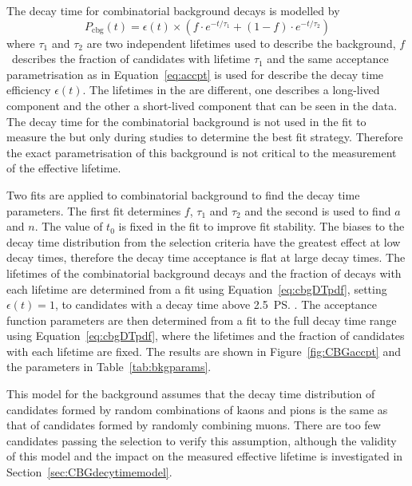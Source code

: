 The decay time \pdf for combinatorial background decays is modelled by
\begin{equation}
P_{\mathrm{cbg}}(t) = \epsilon(t)\times \left( f \cdot e^{-t/\tau_{1}} + (1-f)\cdot e^{-t/\tau_{2}} \right)
\label{eq:cbgDTpdf}
\end{equation}
where $\tau_{1}$ and $\tau_{2}$ are two independent lifetimes used to describe the background, $f$~describes the fraction of candidates with lifetime $\tau_{1}$ and the same acceptance parametrisation as in Equation~\ref{eq:accpt} is used for describe the decay time efficiency $\epsilon(t)$. The lifetimes in the \pdf are different, one describes a long-lived component and the other a short-lived component that can be seen in the data. The decay time \pdf for the combinatorial background is not used in the fit to measure the \el but only during studies to determine the best fit strategy. Therefore the exact parametrisation of this background is not critical to the measurement of the \bsmumu effective lifetime.  

Two fits are applied to \bhh combinatorial background to find the decay time \pdf parameters. The first fit determines $f$, $\tau_1$ and $\tau_2$ and the second is used to find $a$ and $n$. The value of $t_0$ is fixed in the fit to improve fit stability.
The biases to the decay time distribution from the selection criteria have the greatest effect at low decay times, therefore the decay time acceptance is flat at large decay times. The lifetimes of the combinatorial background decays and the fraction of decays with each lifetime are determined from a fit using Equation~\ref{eq:cbgDTpdf}, setting $\epsilon(t)=1$, to candidates with a decay time above 2.5~\ps. The acceptance function parameters are then determined from a fit to the full decay time range using Equation~\ref{eq:cbgDTpdf}, where the lifetimes and the fraction of candidates with each lifetime are fixed. The results are shown in Figure~\ref{fig:CBGaccpt} and the \pdf parameters in Table~\ref{tab:bkgparams}. %

This model for the background assumes that the decay time distribution of \bhh candidates formed by random combinations of kaons and pions is the same as that of \bsmumu candidates formed by randomly combining muons. There are too few candidates passing the \bsmumu selection to verify this assumption, although the validity of this model and the impact on the measured \bsmumu effective lifetime is investigated in Section~\ref{sec:CBGdecytimemodel}.%



